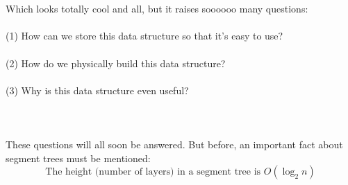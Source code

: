 \documentclass[11pt]{article}
\theoremstyle{plain}
\theoremstyle{definition}
\begin{document}
\\\\
Which looks totally cool and all, but it raises soooooo many questions:
\\\\
(1) How can we store this data structure so that it's easy to use? \\\\
(2) How do we physically build this data structure?\\\\
(3) Why is this data structure even useful?\\\\
\\\\
\noindent These questions will all soon be answered. But before, an important fact about segment trees must be mentioned:
$$\boxed{\text{The height (number of layers) in a segment tree is } O(\log_2{n})}$$
\end{document}

